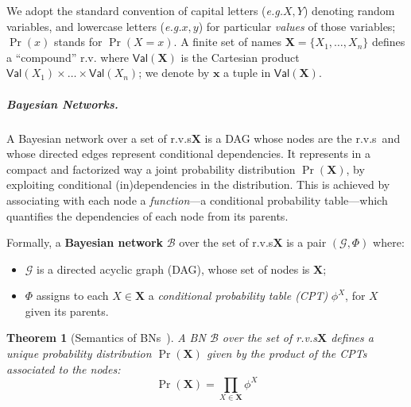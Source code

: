 \documentclass[10pt,a4paper]{article}
\newcommand*{\eg}{\emph{e.g.}\xspace}
\newcommand{\textdef}[1]{\textbf{#1}}
\newcommand*{\G}{\mathcal{G}}
\newcommand{\Val}[1]{\mathsf{Val}(#1)}
\newcommand*{\somebayes}{\mathcal{B}}
\newcommand*{\bn}{\somebayes}
\newcommand{\bX}{\mathbf X}
\newcommand{\bY}{\mathbf Y}
\newcommand{\bZ}{\mathbf Z}
\newcommand{\bx}{{\mathbf x}}
\newcommand{\bz}{{\mathbf z}}
\newcommand{\rv}{r.v.\xspace}
\newcommand{\rvs}{r.v.s\xspace}
\newcommand{\cpt}{CPT\xspace}
\newtheorem{theorem}{Theorem}
\begin{document}
We adopt the standard convention of capital letters (\eg $X,Y$) denoting random variables, and lowercase letters (\eg $x,y$) for particular \emph{values} of those variables; $\Pr(x)$ stands for $\Pr(X=x)$.
A finite set of names $\bX=\{X_1, \dots, X_n\}$ defines a ``compound'' \rv where $\Val{\bX}$ is the Cartesian product $\Val{X_1} \times \dots \times \Val{X_n}$; we denote by $\bx$ a tuple in $\Val{\bX}$.

%

\subparagraph{Bayesian Networks.}

A Bayesian network over a set of \rvs $\bX$ is a DAG whose nodes are the \rvs\ and whose directed edges represent conditional dependencies.
It represents in a compact and factorized way a joint probability distribution $\Pr(\bX)$, by exploiting conditional (in)dependencies in the distribution.
This is achieved by associating with each node a \emph{function}---a conditional probability table---which quantifies the dependencies of each node from its parents.

Formally, a \textdef{Bayesian network} $\bn$ over the set of \rvs $\bX$ is a pair $(\G,\Phi)$ where:
\begin{itemize}
\item $\G$ is a directed acyclic graph (DAG), whose set of nodes is $\bX$;
\item $\Phi$ assigns to each $X\in\bX$ a \emph{conditional probability table (\cpt)} $\phi^X$, for $X$ given its parents.
\end{itemize}

\begin{theorem}[Semantics of BNs~\cite{Pearl86}]
\label{lem:BNsem}
A BN $\bn$ over the set of \rvs $\bX$ defines a unique probability distribution $\Pr(\bX)$ given by the \emph{product} of the CPTs associated to the nodes:
\begin{equation}
\label{eq:BNsem}
\tag{$\ast$}
\Pr(\bX) = \prod_{X\in \bX} \phi^X
\end{equation}
\end{theorem}
\end{document}
